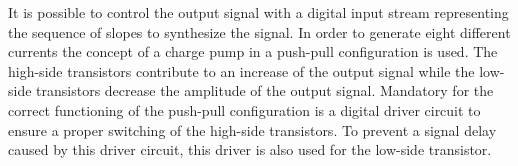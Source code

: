 \documentclass[journal]{IEEEtran}
\begin{document}
It is possible to control the output signal with a digital input stream representing the sequence of slopes to synthesize the signal.
In order to generate eight different currents the concept of a charge pump in a push-pull configuration is used.
The high-side transistors contribute to an increase of the output signal while the low-side transistors decrease the amplitude of the output signal.
Mandatory for the correct functioning of the push-pull configuration is a digital driver circuit to ensure a proper switching of the high-side transistors.
To prevent a signal delay caused by this driver circuit, this driver is also used for the low-side transistor.
%
\end{document}
